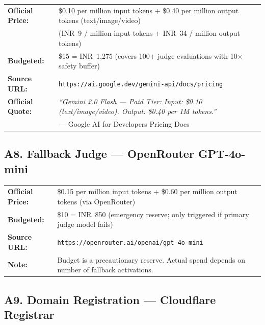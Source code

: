 \documentclass[11pt, a4paper]{article}
\begin{document}
\begin{tcolorbox}[purplebox, title={Google Gemini 2.0 Flash API --- Official Pricing (Paid Tier)}]
\begin{tabularx}{\linewidth}{@{}>{\bfseries}l X@{}}
Official Price:  & \$0.10 per million input tokens + \$0.40 per million output tokens (text/image/video) \\
                 & (INR~9 / million input tokens + INR~34 / million output tokens) \\
Budgeted:        & \$15 = INR~1,275 (covers 100+ judge evaluations with 10$\times$ safety buffer) \\
Source URL:      & \texttt{https://ai.google.dev/gemini-api/docs/pricing} \\
Official Quote:  & \textit{``Gemini 2.0 Flash --- Paid Tier: Input: \$0.10 (text/image/video). Output: \$0.40 per 1M tokens.''} \\
                 & --- Google AI for Developers Pricing Docs \\
\end{tabularx}
\end{tcolorbox}

\subsection*{A8. Fallback Judge --- OpenRouter GPT-4o-mini}

\begin{tcolorbox}[purplebox, title={OpenRouter GPT-4o-mini --- Reference Pricing}]
\begin{tabularx}{\linewidth}{@{}>{\bfseries}l X@{}}
Official Price:  & \$0.15 per million input tokens + \$0.60 per million output tokens (via OpenRouter) \\
Budgeted:        & \$10 = INR~850 (emergency reserve; only triggered if primary judge model fails) \\
Source URL:      & \texttt{https://openrouter.ai/openai/gpt-4o-mini} \\
Note:            & Budget is a precautionary reserve. Actual spend depends on number of fallback activations. \\
\end{tabularx}
\end{tcolorbox}

\subsection*{A9. Domain Registration --- Cloudflare Registrar}
\end{document}
